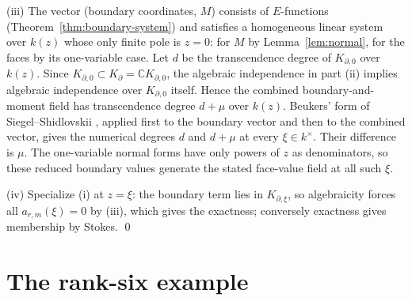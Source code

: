 \documentclass[11pt]{article}
\numberwithin{equation}{section}
\theoremstyle{definition}
\theoremstyle{remark}
\newcommand{\C}{\mathbb C}
\begin{document}
(iii) The vector (boundary coordinates, $M$) consists of $E$-functions
(Theorem~\ref{thm:boundary-system}) and satisfies a homogeneous linear system over $k(z)$
whose only finite pole is $z=0$: for $M$ by Lemma~\ref{lem:normal}, for the
faces by its one-variable case. Let $d$ be the transcendence degree of
$K_{\partial,0}$ over $k(z)$.  Since
$K_{\partial,0}\subset K_\partial=\C K_{\partial,0}$, the algebraic
independence in part (ii) implies algebraic independence over
$K_{\partial,0}$ itself.  Hence the combined boundary-and-moment field
has transcendence degree $d+\mu$ over $k(z)$. Beukers' form of Siegel--Shidlovskii
\cite[Theorem~1.1, p.~370]{Beukers}, applied first to the boundary vector
and then to the combined vector, gives the numerical degrees $d$ and
$d+\mu$ at every $\xi\in k^\times$. Their difference is $\mu$.
The one-variable normal forms have only powers of $z$ as denominators, so
these reduced boundary values generate the stated face-value field at
all such $\xi$.

(iv) Specialize (i) at $z=\xi$: the boundary term lies in $K_{\partial,\xi}$,
so algebraicity forces all $a_{r,m}(\xi)=0$ by (iii), which gives the exactness;
conversely exactness gives membership by Stokes. \qed

\section{The rank-six example}\label{sec:example}
\end{document}
